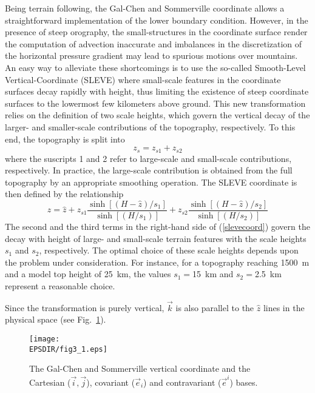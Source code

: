 Being terrain following, the Gal-Chen and Sommerville coordinate allows a
straightforward implementation of the lower boundary condition. However,
in the presence of steep orography, the small-structures in the coordinate 
surface render the computation of advection inaccurate and imbalances in
the discretization of the horizontal pressure gradient may lead to spurious 
motions over mountains. An easy way to alleviate these shortcomings is to 
use the so-called Smooth-Level Vertical-Coordinate (SLEVE) where small-scale
features in the coordinate surfaces decay rapidly with height, thus limiting
the existence of steep coordinate surfaces to the lowermost few kilometers
above ground. This new transformation relies on the definition of two scale 
heights, which govern the vertical decay of the larger- and smaller-scale
contributions of the topography, respectively. To this end, the topography is
split into
\begin{equation}
z_s = z_{s1} +z_{s2}
\end{equation}
where the suscripts 1 and 2 refer to large-scale and small-scale contributions,
respectively. In practice, the large-scale contribution is obtained from the 
full topography by an appropriate smoothing operation. The SLEVE coordinate 
is then defined by the relationship 
\begin{equation}\label{slevecoord}
 z=  \hat z 
+ z_{s1} \frac {\sinh [(H-\hat z)/s_1]} {\sinh [(H/s_1)]}
+ z_{s2} \frac {\sinh [(H-\hat z)/s_2]} {\sinh [(H/s_2)]}
\end{equation}
The second and the third terms in the right-hand side of (\ref{slevecoord})
govern the decay with height of large- and small-scale terrain features 
with the scale heights $s_1$ and $s_2$, respectively.
The optimal choice of these scale 
heights depends upon the problem under consideration. For instance, for a 
topography reaching 1500~m and a model top height of 25~km, the values 
$s_1=$15~km and $s_2=$2.5~km represent a reasonable choice.

Since the transformation is purely vertical, $\vec{k}$
is also parallel to the $\widehat{z}$ lines in the physical space
(see Fig.~\ref{galchen}).

\begin{figure}[!ht]
\centerline{\texttt{[image: \\EPSDIR/fig3\_1.eps]}}
\caption{The Gal-Chen and Sommerville vertical coordinate and the Cartesian
($\vec{i},\vec{j}$), covariant ($\vec{e}_i$) and contravariant ($\vec{e}^i$)
bases.}
\label{galchen}
\end{figure}

